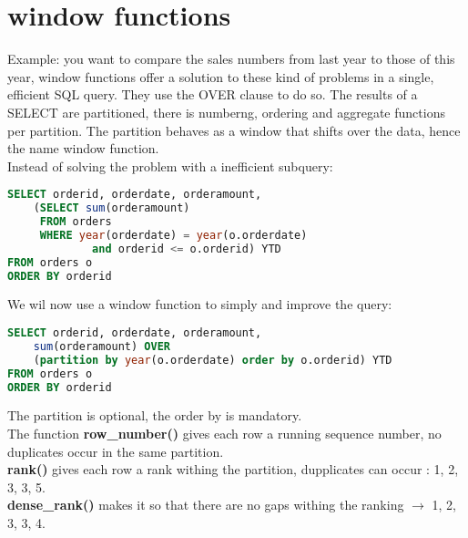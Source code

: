 \documentclass{report}
\begin{document}
	\chapter{window functions}
	Example: you want to compare the sales numbers from last year to those of this year, window functions offer a solution to these kind of problems in a single, efficient SQL query. They use the OVER clause to do so. The results of a SELECT are partitioned, there is numberng, ordering and aggregate functions per partition. The partition behaves as a window that shifts over the data, hence the name window function. \\
	Instead of solving the problem with a inefficient subquery: 
	\begin{lstlisting}[language = sql]
SELECT orderid, orderdate, orderamount,
	(SELECT sum(orderamount)
	 FROM orders 
	 WHERE year(orderdate) = year(o.orderdate) 
	 	     and orderid <= o.orderid) YTD
FROM orders o 
ORDER BY orderid	\end{lstlisting}
	We wil now use a window function to simply and improve the query: 
	\begin{lstlisting}[language=sql]
SELECT orderid, orderdate, orderamount,
	sum(orderamount) OVER 
	(partition by year(o.orderdate) order by o.orderid) YTD
FROM orders o
ORDER BY orderid	\end{lstlisting}	
	The partition is optional, the order by is mandatory. \\The function \textbf{row\_number()} gives each row a running sequence number, no duplicates occur in the same partition. \\ \textbf{rank()} gives each row a rank withing the partition, dupplicates can occur : 1, 2, 3, 3, 5.\\ \textbf{dense\_rank()} makes it so that there are no gaps withing the ranking $\longrightarrow$ 1, 2, 3, 3, 4. \pagebreak
\end{document}
